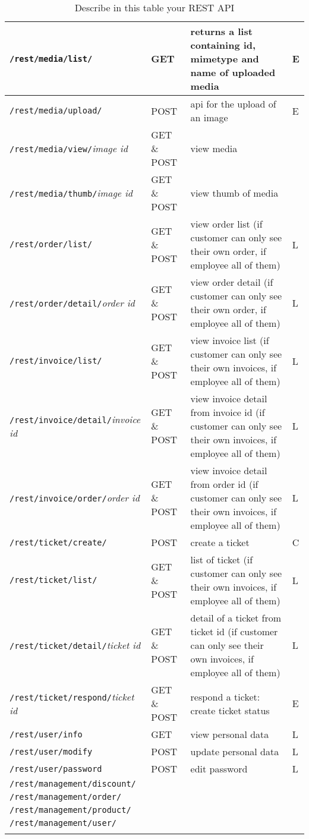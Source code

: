 \begin{longtable}{|p{}|p{} |p{}|p{}|}
\texttt{/rest/media/list/} & GET & returns a list containing id, mimetype and name of uploaded media & E\\\hline
\texttt{/rest/media/upload/} & POST &  api for the upload of an image & E\\\hline
\texttt{/rest/media/view/}\textit{image id} & GET \& POST &  view media &  \\\hline
\texttt{/rest/media/thumb/}\textit{image id} & GET \& POST & view thumb of media &  \\\hline
\texttt{/rest/order/list/} & GET \& POST & view order list (if customer can only see their own order, if employee all of them) & L\\\hline
\texttt{/rest/order/detail/}\textit{order id} & GET \& POST & view order detail (if customer can only see their own order, if employee all of them) & L\\\hline
\texttt{/rest/invoice/list/} & GET \& POST & view invoice list (if customer can only see their own invoices, if employee all of them) & L\\\hline
\texttt{/rest/invoice/detail/}\textit{invoice id} & GET \& POST & view invoice detail from invoice id (if customer can only see their own invoices, if employee all of them) & L\\\hline
\texttt{/rest/invoice/order/}\textit{order id} & GET \& POST & view invoice detail from order id (if customer can only see their own invoices, if employee all of them) & L\\\hline
\texttt{/rest/ticket/create/} & POST  & create a ticket & C \\\hline
\texttt{/rest/ticket/list/} & GET \& POST  & list of ticket (if customer can only see their own invoices, if employee all of them) & L \\\hline
\texttt{/rest/ticket/detail/}\textit{ticket id} & GET \& POST & detail of a ticket from ticket id (if customer can only see their own invoices, if employee all of them) & L \\\hline
\texttt{/rest/ticket/respond/}\textit{ticket id} & GET \& POST & respond a ticket: create ticket status & E \\\hline
\texttt{/rest/user/info} & GET & view personal data & L \\\hline
\texttt{/rest/user/modify} & POST & update personal data & L\\\hline
\texttt{/rest/user/password} & POST & edit password & L\\\hline
\texttt{/rest/management/discount/} & & &\\\hline
\texttt{/rest/management/order/} & & &\\\hline
\texttt{/rest/management/product/} & & &\\\hline
\texttt{/rest/management/user/} & & &\\\hline

\caption{Describe in this table your REST API}
\label{tab:ApiRest}
\end{longtable}